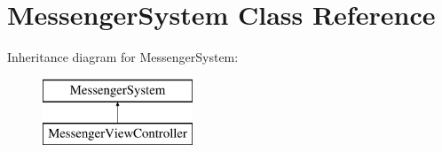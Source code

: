 \hypertarget{interface_messenger_system}{
\section{MessengerSystem Class Reference}
\label{interface_messenger_system}
}
Inheritance diagram for MessengerSystem:\begin{figure}[H]
\begin{center}
\leavevmode
\includegraphics[height=2.000000cm]{interface_messenger_system}
\end{center}
\end{figure}
